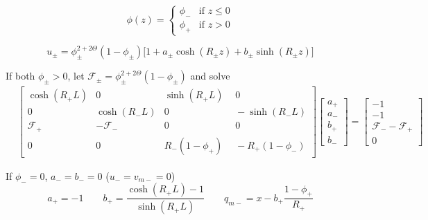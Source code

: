 \documentclass[usenames,dvipsnames,letterpaper,landscape,final]{slides}
\def\cF{\mathcal{F}}
\begin{document}
%
\begin{myslide}

\[
\phi(z) = \begin{cases}  \phi_-&\text{if } z \leq 0\\
                                            \phi_+&\text{if } z > 0\end{cases}
\]\vspace*{-24pt}

\begin{equation*}
u_\pm = \phi_\pm^{2+2\Theta}(1 -\phi_\pm)\big[1 + a_\pm\cosh(R_\pm z) + b_\pm\sinh(R_\pm z) \big]
\end{equation*}

\bigskip\PineGreen{$\bullet$} If both $\phi_\pm>0$, let $\cF_\pm=\phi_\pm^{2+2\Theta}(1 -\phi_\pm)$ and solve
\begin{align*}
\!\!&\left[\begin{matrix}
\cosh(R_+L) & 0 & \sinh(R_+L) &\ \,0\\
0 & \cosh(R_-L) & 0 &\ \,-\sinh(R_-L)\\
\cF_+& -\cF_- & 0 &\ \,0\\
0 & 0 & R_-(1-\phi_+) &\ \,-R_+(1-\phi_-)
\end{matrix}\right]\!\left[\begin{matrix}
a_+\\a_-\\b_+\\b_-
\end{matrix}\right]
=
\left[\begin{matrix}
-1\\-1\\\cF_- - \cF_+ \\0
\end{matrix}\right]
\end{align*}

\bigskip\PineGreen{$\bullet$} If $\phi_-=0$, $a_-=b_-=0$ ($u_-=v_{m-}=0$)
\begin{equation*}
a_+ = -1
\qquad b_+ = \frac{\cosh(R_+L) - 1}{\sinh(R_+L)}
\qquad q_{m-} = x - b_+\frac{1-\phi_+}{R_+}
\end{equation*}

\end{myslide}
\end{document}

